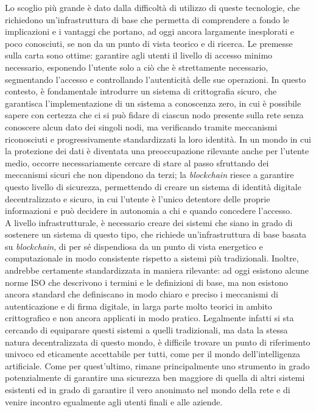 Lo scoglio più grande è dato dalla difficoltà di utilizzo di queste tecnologie, che richiedono un'infrastruttura di base che permetta di comprendere a fondo le implicazioni e i vantaggi che portano, ad oggi ancora largamente inesplorati e poco conosciuti, se non da un punto di vista teorico e di ricerca.
Le premesse sulla carta sono ottime: garantire agli utenti il livello di accesso minimo necessario, esponendo l'utente solo a ciò che è strettamente necessario, segmentando l'accesso e controllando l'autenticità delle sue operazioni.
In questo contesto, è fondamentale introdurre un sistema di crittografia sicuro, che garantisca l'implementazione di un sistema a conoscenza zero, in cui è possibile sapere con certezza che ci si può fidare di ciascun nodo presente sulla rete senza conoscere 
alcun dato dei singoli nodi, ma verificando tramite meccanismi riconosciuti e progressivamente standardizzati la loro identità. 
In un mondo in cui la protezione dei dati è diventata una preoccupazione rilevante anche per l'utente medio, occorre necessariamente cercare di stare al passo sfruttando dei meccanismi sicuri che non dipendono da terzi; la \textit{blockchain} riesce a garantire questo livello di sicurezza,
permettendo di creare un sistema di identità digitale decentralizzato e sicuro, in cui l'utente è l'unico detentore delle proprie informazioni e può decidere in autonomia a chi e quando concedere l'accesso. \\

A livello infrastrutturale, è necessario creare dei sistemi che siano in grado di sostenere un sistema di questo tipo, che richiede un'infrastruttura di base basata su \textit{blockchain}, di per sé dispendiosa da un punto di vista energetico e computazionale in modo consistente rispetto a sistemi più tradizionali.
Inoltre, andrebbe certamente standardizzata in maniera rilevante: ad oggi esistono alcune norme ISO che descrivono i termini e le definizioni di base, ma non esistono ancora standard che definiscano in modo chiaro e preciso i meccanismi di autenticazione e di firma digitale,
in larga parte molto teorici in ambito crittografico e non ancora applicati in modo pratico. Legalmente infatti si sta cercando di equiparare questi sistemi a quelli tradizionali, ma data la stessa natura decentralizzata di questo mondo, è difficile trovare un punto di riferimento
univoco ed eticamente accettabile per tutti, come per il mondo dell'intelligenza artificiale. Come per quest'ultimo, rimane principalmente uno strumento in grado potenzialmente di garantire una sicurezza ben maggiore di quella di altri sistemi esistenti ed in grado 
di garantire il vero anonimato nel mondo della rete e di venire incontro egualmente agli utenti finali e alle aziende. 


